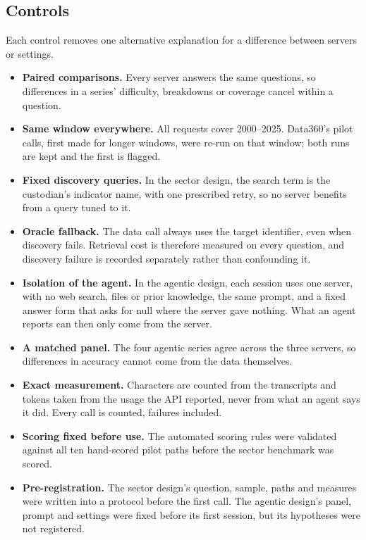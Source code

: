 \documentclass[11pt,a4paper]{article}
\begin{document}
\subsection{Controls}
Each control removes one alternative explanation for a difference between servers or settings.
\begin{itemize}
\item \textbf{Paired comparisons.} Every server answers the same questions, so differences in a series' difficulty, breakdowns or coverage cancel within a question.
\item \textbf{Same window everywhere.} All requests cover 2000--2025. Data360's pilot calls, first made for longer windows, were re-run on that window; both runs are kept and the first is flagged.
\item \textbf{Fixed discovery queries.} In the sector design, the search term is the custodian's indicator name, with one prescribed retry, so no server benefits from a query tuned to it.
\item \textbf{Oracle fallback.} The data call always uses the target identifier, even when discovery fails. Retrieval cost is therefore measured on every question, and discovery failure is recorded separately rather than confounding it.
\item \textbf{Isolation of the agent.} In the agentic design, each session uses one server, with no web search, files or prior knowledge, the same prompt, and a fixed answer form that asks for null where the server gave nothing. What an agent reports can then only come from the server.
\item \textbf{A matched panel.} The four agentic series agree across the three servers, so differences in accuracy cannot come from the data themselves.
\item \textbf{Exact measurement.} Characters are counted from the transcripts and tokens taken from the usage the API reported, never from what an agent says it did. Every call is counted, failures included.
\item \textbf{Scoring fixed before use.} The automated scoring rules were validated against all ten hand-scored pilot paths before the sector benchmark was scored.
\item \textbf{Pre-registration.} The sector design's question, sample, paths and measures were written into a protocol before the first call. The agentic design's panel, prompt and settings were fixed before its first session, but its hypotheses were not registered.
\end{itemize}
\end{document}
